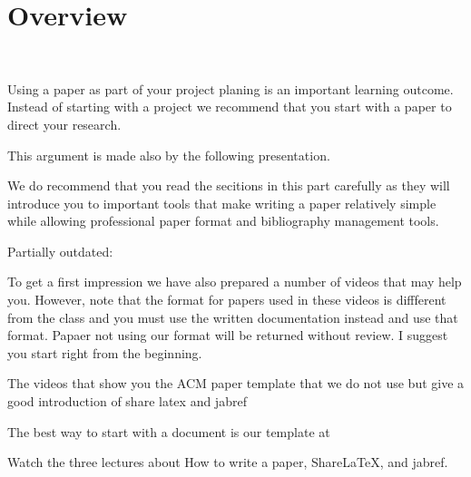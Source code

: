 \section{Overview}\label{C:overview-doc}

\FILENAME\

Using a paper as part of your project planing is an important learning
outcome. Instead of starting with a project we recommend that you
start with a paper to direct your research.

This argument is made also by the following presentation.


We do recommend that you read the secitions in this part carefully as they will introduce you to important tools that make writing a paper relatively simple while allowing professional paper format and bibliography management tools.

\begin{WARNING} 

Partially outdated:

To get a first impression we have also prepared a number of videos that may help you. However, note that the format for papers used in these videos is diffferent from the class and you must use the written documentation instead and use that format. Papaer not using our format will be returned without review. I suggest you start right from the beginning.

The videos that show you the ACM paper template that we do not use but
give a good introduction of share latex and jabref



\end{WARNING}

The best way to start with a document is our template at 


\begin{exercise}\label{E:Documentation.1}
Watch the three lectures about How to write a paper, ShareLaTeX, and jabref.
\end{exercise}